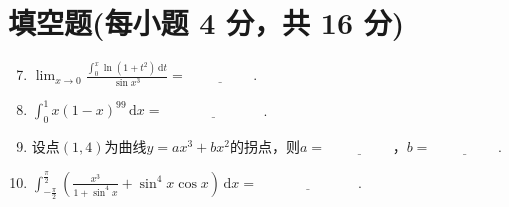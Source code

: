 \documentclass[../Main.tex]{subfiles}
\begin{document}
\section{填空题(每小题 4 分，共 16 分)}
\begin{enumerate}
    \setcounter{enumi}{6}
    \item $\lim_{x\to0}\frac{\displaystyle\int_{0}^{x}\ln(1+t^{2})\,\mathrm{d}t}{\sin
                  x^{3}}=\underline{\hspace{2cm}}$.

    \item $\int_{0}^{1}x(1-x)^{99}\,\mathrm{d}x=\underline{\hspace{3cm}}$.

    \item 设点$(1,4)$为曲线$y=ax^{3}+bx^{2}$的拐点，则$a=\underline{\hspace{2cm}
              }$，$b=\underline{\hspace{2cm}}$.

    \item $\int_{-\frac{\pi}{2}}^{\frac{\pi}{2}}\left(\frac{x^{3}}{1+\sin^{4}
                  x}+\sin^{4} x\cos x\right)\,\mathrm{d}x=\underline{\hspace{3cm}}$.
\end{enumerate}
\end{document}
